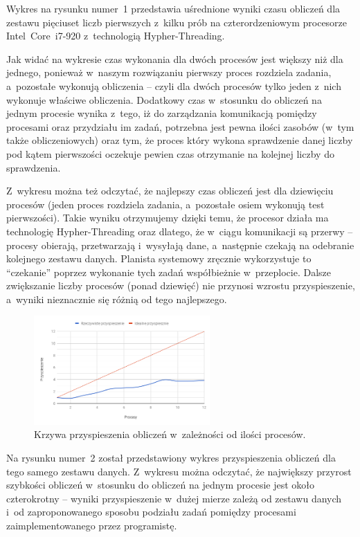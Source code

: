 \documentclass[a4paper,12pt]{article}
\begin{document}
Wykres na rysunku numer~1 przedstawia uśrednione wyniki czasu obliczeń dla zestawu pięciuset liczb pierwszych z~kilku prób na czterordzeniowym procesorze Intel\textregistered\ Core\texttrademark\ i7-920 z~technologią Hypher-Threading.

Jak widać na wykresie czas wykonania dla dwóch procesów jest większy niż dla jednego, ponieważ w~naszym rozwiązaniu pierwszy proces rozdziela zadania, a~pozostałe wykonują obliczenia -- czyli dla dwóch procesów tylko jeden z~nich wykonuje właściwe obliczenia. Dodatkowy czas w~stosunku do obliczeń na jednym procesie wynika z~tego, iż do zarządzania komunikacją pomiędzy procesami oraz przydziału im zadań, potrzebna jest pewna ilości zasobów (w~tym także obliczeniowych) oraz tym, że proces który wykona sprawdzenie danej liczby pod kątem pierwszości oczekuje pewien czas otrzymanie na kolejnej liczby do sprawdzenia.

Z~wykresu można też odczytać, że najlepszy czas obliczeń jest dla dziewięciu procesów (jeden proces rozdziela zadania, a~pozostałe osiem wykonują test pierwszości). Takie wyniku otrzymujemy dzięki temu, że procesor działa ma technologię Hypher-Threading oraz dlatego, że w~ciągu komunikacji są przerwy -- procesy obierają, przetwarzają i~wysyłają dane, a~następnie czekają na odebranie kolejnego zestawu danych. Planista systemowy zręcznie wykorzystuje to ``czekanie'' poprzez wykonanie tych zadań współbieżnie w~przeplocie. Dalsze zwiększanie liczby procesów (ponad dziewięć) nie przynosi wzrostu przyspieszenie, a~wyniki nieznacznie się różnią od tego najlepszego.

\begin{figure}[!htbp]
  \centering
    \includegraphics[width=0.6\textwidth]{chart2}
    \caption{Krzywa przyspieszenia obliczeń w~zależności od ilości procesów.}
  \label{chart-acceleration}
\end{figure}
Na rysunku numer~2 został przedstawiony wykres przyspieszenia obliczeń dla tego samego zestawu danych. Z~wykresu można odczytać, że największy przyrost szybkości obliczeń w~stosunku do obliczeń na jednym procesie jest około czterokrotny -- wyniki przyspieszenie w~dużej mierze zależą od zestawu danych i~od zaproponowanego sposobu podziału zadań pomiędzy procesami zaimplementowanego przez programistę.
\end{document}
